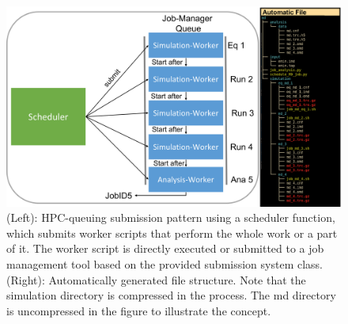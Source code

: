 \begin{figure}[h]
    \centering
    \includegraphics[width=\textwidth]{fig/implementation/SimulationExecutionManagment.png}
    \caption{(Left): HPC-queuing submission pattern using a scheduler function, which submits worker scripts that perform the whole work or a part of it. The worker script is directly executed or submitted to a job management tool based on the provided submission system class. (Right): Automatically generated file structure. Note that the simulation directory is compressed in the process. The md directory is uncompressed in the figure to illustrate the concept. %
    }
    \label{fig: SimulationExecPattern}
\end{figure}

